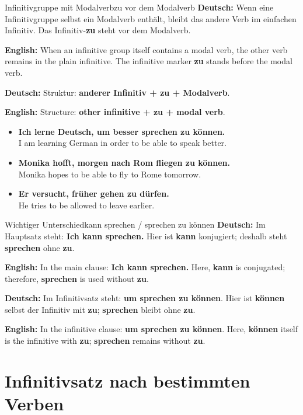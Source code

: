 \documentclass[a4paper,11pt]{article}
\newcommand{\GermanText}[1]{\textbf{Deutsch: }#1\par}
\newcommand{\EnglishText}[1]{{\small\color{SoftGray}\textbf{English: }#1\par}}
\newcommand{\ExampleItem}[2]{\item \textbf{#1}\\{\small\color{SoftGray}#2}}
\begin{document}
            \begin{grammarentry}{Infinitivgruppe mit Modalverb}{zu vor dem Modalverb}
                \GermanText{Wenn eine Infinitivgruppe selbst ein Modalverb enthält, bleibt das andere Verb im einfachen Infinitiv. Das Infinitiv-\textbf{zu} steht vor dem Modalverb.}
                \EnglishText{When an infinitive group itself contains a modal verb, the other verb remains in the plain infinitive. The infinitive marker \textbf{zu} stands before the modal verb.}

                \GermanText{Struktur: \textbf{anderer Infinitiv + zu + Modalverb}.}
                \EnglishText{Structure: \textbf{other infinitive + zu + modal verb}.}
            \end{grammarentry}

            \begin{exbox}
                \begin{itemize}
                    \ExampleItem{Ich lerne Deutsch, um besser sprechen zu können.}{I am learning German in order to be able to speak better.}
                    \ExampleItem{Monika hofft, morgen nach Rom fliegen zu können.}{Monika hopes to be able to fly to Rome tomorrow.}
                    \ExampleItem{Er versucht, früher gehen zu dürfen.}{He tries to be allowed to leave earlier.}
                \end{itemize}
            \end{exbox}

            \begin{grammarentry}{Wichtiger Unterschied}{kann sprechen / sprechen zu können}
                \GermanText{Im Hauptsatz steht: \textbf{Ich kann sprechen.} Hier ist \textbf{kann} konjugiert; deshalb steht \textbf{sprechen} ohne \textbf{zu}.}
                \EnglishText{In the main clause: \textbf{Ich kann sprechen.} Here, \textbf{kann} is conjugated; therefore, \textbf{sprechen} is used without \textbf{zu}.}

                \GermanText{Im Infinitivsatz steht: \textbf{um sprechen zu können}. Hier ist \textbf{können} selbst der Infinitiv mit \textbf{zu}; \textbf{sprechen} bleibt ohne \textbf{zu}.}
                \EnglishText{In the infinitive clause: \textbf{um sprechen zu können}. Here, \textbf{können} itself is the infinitive with \textbf{zu}; \textbf{sprechen} remains without \textbf{zu}.}
            \end{grammarentry}


    \section{Infinitivsatz nach bestimmten Verben}
\end{document}
